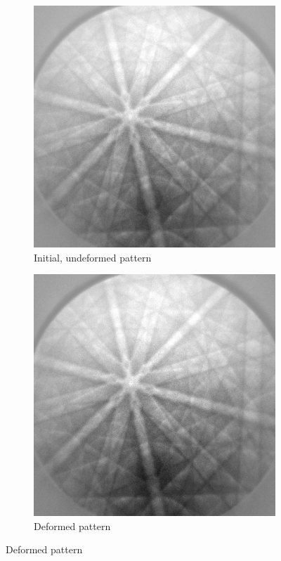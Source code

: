 \begin{figure}
	
	\begin{subfigure}{.4\textwidth}
		\centering
		\includegraphics[width=.9\linewidth]{img/roi_shifts_initial}
		\caption{Initial, undeformed pattern}
		\label{roi-shifts:initial}
	\end{subfigure}%
	\begin{subfigure}{.4\textwidth}
		\centering
		\includegraphics[width=.9\linewidth]{img/DEFORMED_x3600y6235}
		\caption{Deformed pattern}
		

\end{subfigure}
\end{figure}
